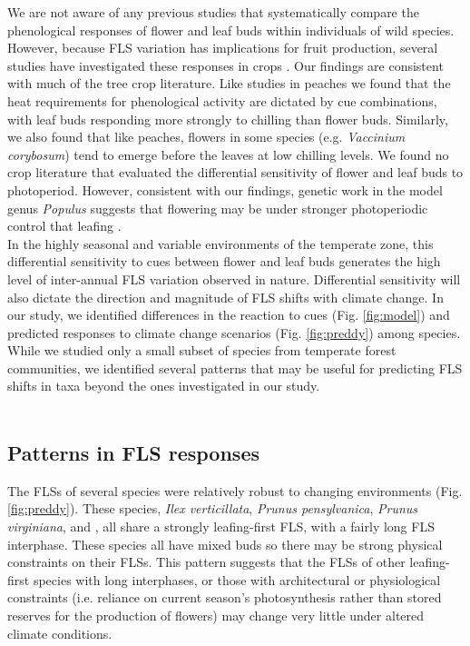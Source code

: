 \documentclass[11pt]{article}
\begin{document}
\noindent We are not aware of any previous studies that systematically compare the phenological responses of flower and leaf buds within individuals of wild species. However, because FLS variation has implications for fruit production, several studies have investigated these responses in crops \citep[see][]{Guo2014,Gariglio2006,Citadin2001}. Our findings are consistent with much of the tree crop literature. Like studies in peaches \citep{Gariglio2006,Citadin2001} we found that the heat requirements for phenological activity are dictated by cue combinations, with leaf buds responding more strongly to chilling than flower buds. Similarly, we also found that like peaches, flowers in some species (e.g. \textit{Vaccinium corybosum}) tend to emerge before the leaves at low chilling levels. We found no crop literature that evaluated the differential sensitivity of flower and leaf buds to photoperiod. However, consistent with our findings, genetic work in the model genus \textit{Populus} suggests that flowering may be under stronger photoperiodic control that leafing \citep{Glover2014}.\\

\noindent In the highly seasonal and variable environments of the temperate zone, this differential sensitivity to cues between flower and leaf buds generates the high level of inter-annual FLS variation observed in nature. Differential sensitivity will also dictate the direction and magnitude of FLS shifts with climate change. In our study, we identified differences in the reaction to cues  (Fig. \ref{fig:model}) and predicted responses to climate change scenarios (Fig. \ref{fig:preddy}) among species. While we studied only a small subset of species from temperate forest communities, we identified several patterns that may be useful for predicting FLS shifts in taxa beyond the ones investigated in our study.\\\\


\subsection*{Patterns in FLS responses}
\noindent The FLSs of several species were relatively robust to changing environments (Fig. \ref{fig:preddy}). These species, \textit{Ilex verticillata}, \textit{Prunus pensylvanica}, \textit{Prunus virginiana}, and , all share a strongly leafing-first FLS, with a fairly long FLS interphase. These species all have mixed buds so there may be strong physical constraints on their FLSs. This pattern suggests that the FLSs of other leafing-first species with long interphases, or those with architectural or physiological constraints (i.e. reliance on current season's photosynthesis rather than stored reserves for the production of flowers) may change very little under altered climate conditions.\\
\end{document}
